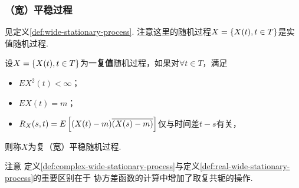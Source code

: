 \begin{frame}
    \frametitle{（宽）平稳过程}
    \begin{mydefinition}[实（宽）平稳过程]\label{def:real-wide-stationary-process}
        见定义\ref{def:wide-stationary-process}. 注意这里的随机过程$X=\left\{X(t),t\in T\right\}$是实值随机过程. 
    \end{mydefinition}
    \begin{mydefinition}[复（宽）平稳过程]\label{def:complex-wide-stationary-process}
        设$X=\left\{X(t),t\in T\right\}$为一\textbf{复值}随机过程，如果对$\forall t\in T$，满足
        \begin{itemize}
            \item $EX^2(t)<\infty$；
            \item $EX(t)=m$；
            \item $R_X(s,t)=E\left[(X(t)-m)\overline{(X(s)-m)}\right]$仅与时间差$t-s$有关，
        \end{itemize}
        则称$X$为复（宽）平稳随机过程.
    \end{mydefinition}
    \begin{alertblock}{注意}
        定义\ref{def:complex-wide-stationary-process}与定义\ref{def:real-wide-stationary-process}的重要区别在于
        协方差函数的计算中增加了取复共轭的操作.
    \end{alertblock}
\end{frame}

